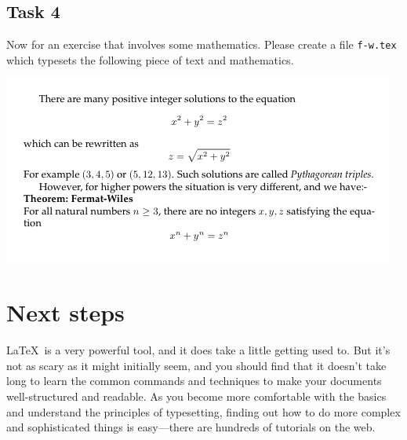 \begin{refsection}
\subsection{Task 4}
\label{sec:task-4}

 Now for an exercise that involves some mathematics. Please create a file \texttt{f-w.tex} which typesets the following piece of text and mathematics.
\begin{center}
  \includegraphics[width=.95\textwidth]{images/f-w.png}
\end{center}


\section{Next steps}

\LaTeX\ is a very powerful tool, and it does take a little getting used to. But it's not as scary as it might initially seem, and you should find that it doesn't take long to learn the common commands and techniques to make your documents well-structured and readable. As you become more comfortable with the basics and understand the principles of typesetting, finding out how to do more complex and sophisticated things is easy---there are hundreds of tutorials on the web. 


\end{refsection}
